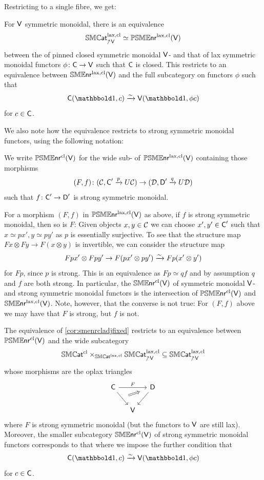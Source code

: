 \documentclass[a4paper,11pt]{article}
\newcommand{\SMENRcl}{\SMENR^{\cl}}
\begin{document}
Restricting to a single fibre, we get:
\begin{cornoproof}\label{cor:smenrcladjfixed}
  For $\textup{\textsf{V}}$ symmetric monoidal, there is an equivalence
  \[ \SMCATlcl_{\upslash \oV} \simeq \PSMENRlcl(\oV) \]
  between the \icat{} of pinned closed symmetric monoidal
  $\textup{\textsf{V}}$-\icats{} and that of lax symmetric monoidal functors $\phi
  \colon \oC \to \oV$ such that $\textup{\textsf{C}}$ is closed. This restricts to an
  equivalence between $\mathbb{SME}\mkern-0.5mu\textsf{\textup{nr}}^{\text{\textup{lax}},\text{\textup{cl}}}(\textup{\textsf{V}})$ and the full subcategory on
  functors $\phi$ such that
  \[ \oC(\bbone,c) \isoto \oV(\bbone, \phi c)\]
  for $c \in \textup{\textsf{C}}$. 
\end{cornoproof}

We also note how the equivalence restricts to strong symmetric
monoidal functors, using the following notation:
\begin{notation}
  We write $\mathbb{PSME}\mkern-0.5mu\textsf{\textup{nr}}^{\text{\textup{cl}}}(\textup{\textsf{V}})$ for the wide sub-\itcat{} of
  $\mathbb{PSME}\mkern-0.5mu\textsf{\textup{nr}}^{\text{\textup{lax}},\text{\textup{cl}}}(\textup{\textsf{V}})$ containing those morphisms
  \[ (F,f) \colon (\eC, \oC' \xto{p} U\eC) \to (\eD, \oD' \xto{q} U\eD)\]
  such that $f \colon \oC' \to \oD'$ is strong symmetric monoidal.
\end{notation}

\begin{observation}
  For a morphism $(F,f)$ in
  $\mathbb{PSME}\mkern-0.5mu\textsf{\textup{nr}}^{\text{\textup{lax}},\text{\textup{cl}}}(\textup{\textsf{V}})$ as above, if $f$ is strong symmetric monoidal, then so is
  $F$: Given objects $x,y \in \mathcal{C}$ we can choose $x',y' \in \textup{\textsf{C}}'$ such
  that $x \simeq px', y \simeq py'$ as $p$ is essentially surjective.
  To see that the structure map $Fx \otimes Fy \to F(x \otimes y)$ is
  invertible, we can consider the structure map
  \[ Fpx'  \otimes Fp y' \to F(px' \otimes py') \isoto Fp(x' \otimes y')\]
  for $Fp$, since $p$ is strong. This is an equivalence as $Fp \simeq
  qf$ and by assumption $q$ and $f$ are both strong. In particular,
  the \itcat{}
  $\SMENRcl(\oV)$ of symmetric monoidal $\textup{\textsf{V}}$-\icats{} and strong
  symmetric monoidal functors is the intersection of  $\mathbb{PSME}\mkern-0.5mu\textsf{\textup{nr}}^{\text{\textup{cl}}}(\textup{\textsf{V}})$
  and $\mathbb{SME}\mkern-0.5mu\textsf{\textup{nr}}^{\text{\textup{lax}},\text{\textup{cl}}}(\textup{\textsf{V}})$. Note, however, that the converse is not true:
  For $(F,f)$ above we may have that $F$ is strong, but $f$ is not.
\end{observation}

\begin{cornoproof}
  The equivalence of \cref{cor:smenrcladjfixed} restricts to an
  equivalence between $\mathbb{PSME}\mkern-0.5mu\textsf{\textup{nr}}^{\text{\textup{cl}}}(\textup{\textsf{V}})$ and the wide
  subcategory
  \[ \SMCATcl \times_{\SMCATlcl} \SMCATlcl_{\upslash \oV} \subseteq
    \SMCATlcl_{\upslash \oV}\]
  whose morphisms are the oplax triangles
      \[
    \begin{tikzcd}[column sep=small]
     \oC \ar[rr, "F"] \ar[dr, ""{name=A}] & & \oD \ar[dl] \\
     & \oV
     \arrow[from=A,to=1-3,Rightarrow,shorten <=4pt, shorten >=10pt]
    \end{tikzcd}
  \]
  where $F$ is strong symmetric monoidal (but the functors to $\textup{\textsf{V}}$
  are still lax). Moreover, the smaller subcategory  $\SMENRcl(\oV)$
  of strong symmetric monoidal functors
  corresponds to that where we impose the further condition that
    \[ \oC(\bbone,c) \isoto \oV(\bbone, \phi c)\]
  for $c \in \textup{\textsf{C}}$.
\end{cornoproof}
\end{document}
